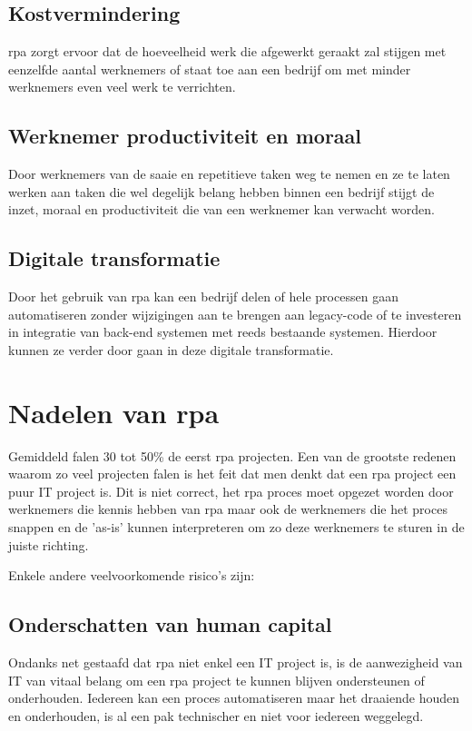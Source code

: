 \subsection{Kostvermindering}
\acrshort{rpa} zorgt ervoor dat de hoeveelheid werk die afgewerkt geraakt zal stijgen met eenzelfde aantal werknemers of staat toe aan een bedrijf om met minder werknemers even veel werk te verrichten. \autocite{efficiencyRPA}

\subsection{Werknemer productiviteit en moraal}
Door werknemers van de saaie en repetitieve taken weg te nemen en ze te laten werken aan taken die wel degelijk belang hebben binnen een bedrijf stijgt de inzet, moraal en productiviteit die van een werknemer kan verwacht worden. \autocite{efficiencyRPA}

\subsection{Digitale transformatie}
Door het gebruik van \acrshort{rpa} kan een bedrijf delen of hele processen gaan automatiseren zonder wijzigingen aan te brengen aan legacy-code of te investeren in integratie van back-end systemen met reeds bestaande systemen. Hierdoor kunnen ze verder door gaan in deze digitale transformatie. \autocite{efficiencyRPA}

\section{Nadelen van \acrshort{rpa}}
Gemiddeld falen 30 tot 50\% de eerst \acrshort{rpa} projecten. \autocite{everythingRPA} Een van de grootste redenen waarom zo veel projecten falen is het feit dat men denkt dat een \acrshort{rpa} project een puur IT project is. Dit is niet correct, het \acrshort{rpa} proces moet opgezet worden door werknemers die kennis hebben van \acrshort{rpa} maar ook de werknemers die het proces snappen en de 'as-is' kunnen interpreteren om zo deze werknemers te sturen in de juiste richting.

Enkele andere veelvoorkomende risico's zijn:

\subsection{Onderschatten van human capital}
Ondanks net gestaafd dat \acrshort{rpa} niet enkel een IT project is, is de aanwezigheid van IT van vitaal belang om een \acrshort{rpa} project te kunnen blijven ondersteunen of onderhouden. Iedereen kan een proces automatiseren maar het draaiende houden en onderhouden, is al een pak technischer en niet voor iedereen weggelegd. \autocite{everythingRPA}

